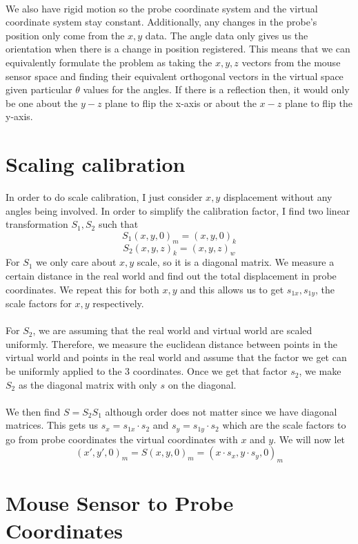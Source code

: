 \documentclass[11pt,psfig]{article}
\begin{document}
\\
We also have rigid motion so the probe coordinate system and the virtual coordinate system stay constant. Additionally, any changes in the probe's position only come from the $x,y$ data. The angle data only gives us the orientation when there is a change in position registered. This means that we can equivalently formulate the problem as taking the $x,y,z$ vectors from the mouse sensor space and finding their equivalent orthogonal vectors in the virtual space given particular $\theta$ values for the angles. If there is a reflection then, it would only be one about the $y-z$ plane to flip the x-axis or about the $x-z$ plane to flip the y-axis. 

\section*{Scaling calibration}

In order to do scale calibration, I just consider $x,y$ displacement without any angles being involved. In order to simplify the calibration factor, I find two linear transformation $S_1,S_2$ such that 
\[
S_1(x,y,0)_m = (x,y,0)_k
\]
\[
S_2(x,y,z)_k = (x,y,z)_w
\]
For $S_1$ we only care about $x,y$ scale, so it is a diagonal matrix. We measure a certain distance in the real world and find out the total displacement in probe coordinates. We repeat this for both $x,y$ and this allows us to get $s_{1x},s_{1y}$, the scale factors for $x,y$ respectively. \\
\\
For $S_2$, we are assuming that the real world and virtual world are scaled uniformly. Therefore, we measure the euclidean distance between points in the virtual world and points in the real world and assume that the factor we get can be uniformly applied to the 3 coordinates. Once we get that factor $s_2$, we make $S_2$ as the diagonal matrix with only $s$ on the diagonal. \\
\\
We then find $S=S_2S_1$ although order does not matter since we have diagonal matrices. This gets us $s_x=s_{1x} \cdot s_2$ and $s_y=s_{1y} \cdot s_2$ which are the scale factors to go from probe coordinates the virtual coordinates with $x$ and $y$. We will now let
\[
(x',y',0)_m = S(x,y,0)_m = (x \cdot s_x, y \cdot s_y, 0)_m
\]

\section*{Mouse Sensor to Probe Coordinates}
\end{document}
